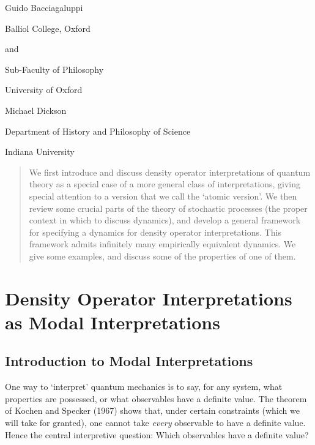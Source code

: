 \documentclass[12pt]{article}
\begin{document}
\thispagestyle{empty}
\begin{center}


\vspace{40pt}
\noindent Guido Bacciagaluppi

\noindent Balliol College, Oxford

\noindent and

\noindent Sub-Faculty of Philosophy

\noindent University of Oxford

\vspace{20pt}
\noindent Michael Dickson

\noindent Department of History and Philosophy of Science

\noindent Indiana University

\vspace{20pt}
\end{center}

\begin{quotation}
\noindent We first introduce and discuss density operator 
interpretations of quantum theory as a special case of a more general 
class of interpretations, giving special attention to a version that 
we call the `atomic version'.  We then review some crucial parts of 
the theory of stochastic processes (the proper context in which to 
discuss dynamics), and develop a general framework for specifying a 
dynamics for density operator interpretations.  This framework admits 
infinitely many empirically equivalent dynamics.  We give some 
examples, and discuss some of the properties of one of them.
\end{quotation}

\newpage

\setcounter{page}{1}


\section{Density Operator Interpretations as Modal Interpretations}

\subsection{Introduction to Modal Interpretations}

\noindent One way to `interpret' quantum mechanics is to say, for any
system, what properties are possessed, or what observables have a
definite value.  The theorem of Kochen and Specker (1967) shows that,
under certain constraints (which we will take for granted), one
cannot take {\it every} observable to have a definite value.  Hence
the central interpretive question: Which observables have a definite
value?
\end{document}
